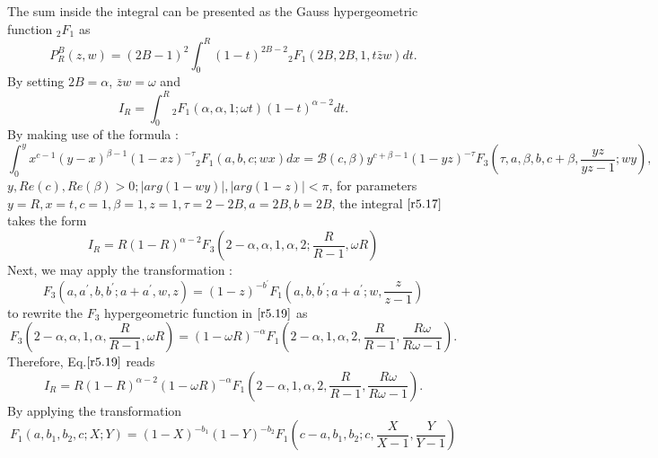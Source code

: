 The sum inside the integral can be presented as the Gauss hypergeometric
function ${}_{2}F_{1}$ as 
\begin{equation}
\label{r5.16}
P_{R}^{B}(z,w)=(2B-1)^{2}\int_{0}^{R}(1-t)^{2B-2}{}_{2}F_{1}(2B,2B,1,t\bar{z}%
w)dt. 
\end{equation}
By setting $2B=\alpha $, $\bar{z}w=\omega $ and 
\begin{equation}
\label{r5.17}
I_{R}=\int_{0}^{R}{}_{2}F_{1}(\alpha ,\alpha ,1;\omega t)(1-t)^{\alpha -2}dt.
\end{equation}
By making use of the formula   \cite[p.316]{PBM}  
: 
\begin{equation}
\label{r5.18}
\int_{0}^{y}x^{c-1}(y-x)^{\beta -1}(1-xz)^{-\tau }{}_{2}F_{1}(a,b,c;wx)dx=%
\mathcal{B}(c,\beta )y^{c+\beta -1}(1-yz)^{-\tau }F_{3}(\tau ,a,\beta
,b,c+\beta ,\frac{yz}{yz-1};wy),  
\end{equation}
$y,Re(c),Re(\beta )>0;|arg(1-wy)|,|arg(1-z)|<\pi $, for parameters $%
y=R,x=t,c=1,\beta =1,z=1,\tau =2-2B,a=2B,b=2B$, the integral $\eqref{r5.17} $ takes the form 
\begin{equation}
\label{r5.19}
I_{R}=R(1-R)^{\alpha -2}F_{3}(2-\alpha ,\alpha ,1,\alpha ,2;\frac{R}{R-1}%
,\omega R)  
\end{equation}
Next, we may apply the transformation \cite[p.450]{PBM}: 
\begin{equation}
\label{r5.20}
F_{3}\left( a,a^{\prime },b,b^{\prime };a+a^{\prime },w,z\right)
=(1-z)^{-b^{\prime }}F_{1}\left( a,b,b^{\prime };a+a^{\prime };w,\frac{z}{z-1%
}\right)  
\end{equation}
to rewrite the $F_{3}$ hypergeometric function in $\eqref{r5.19} $ as 
\begin{equation}
\label{r5.21}
F_{3}\left( 2-\alpha ,\alpha ,1,\alpha ,\frac{R}{R-1},\omega R\right)
=(1-\omega R)^{-\alpha }F_{1}\left( 2-\alpha ,1,\alpha ,2,\frac{R}{R-1},%
\frac{R\omega }{R\omega -1}\right) .  
\end{equation}%
Therefore, Eq.$\eqref{r5.19} $ reads 
\begin{equation}
\label{r5.22}
I_{R}=R(1-R)^{\alpha -2}(1-\omega R)^{-\alpha }F_{1}\left( 2-\alpha
,1,\alpha ,2,\frac{R}{R-1},\frac{R\omega }{R\omega -1}\right) . 
\end{equation}
By applying the transformation 
\begin{equation}
\label{r5.23}
F_{1}\left( a,b_{1},b_{2},c;X;Y\right)
=(1-X)^{-b_{1}}(1-Y)^{-b_{2}}F_{1}\left( c-a,b_{1},b_{2};c,\frac{X}{X-1},%
\frac{Y}{Y-1}\right)
\end{equation}
